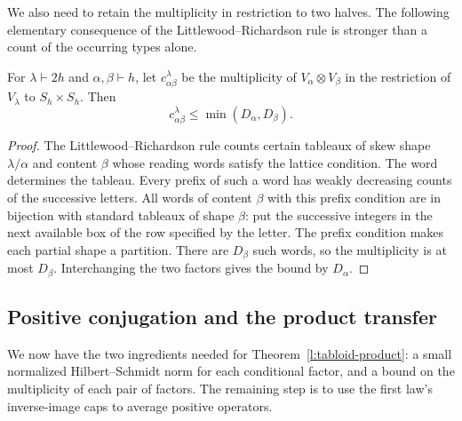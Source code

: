 We also need to retain the multiplicity in restriction to two halves.
The following elementary consequence of the Littlewood--Richardson
rule is stronger than a count of the occurring types alone.

\begin{lemma}
\label{l:tabloid-lr}
For $\lambda\vdash 2h$ and $\alpha,\beta\vdash h$, let
$c_{\alpha\beta}^\lambda$ be the multiplicity of
$V_\alpha\otimes V_\beta$ in the restriction of $V_\lambda$
to $S_h\times S_h$.  Then
\[
 c_{\alpha\beta}^\lambda\le\min(D_\alpha,D_\beta).
\]
\end{lemma}

\begin{proof}
The Littlewood--Richardson rule counts certain tableaux of skew
shape $\lambda/\alpha$ and content $\beta$ whose reading words
satisfy the lattice condition.  The word determines the tableau.
Every prefix of such a word has weakly decreasing counts of the
successive letters.  All words of content $\beta$ with this prefix
condition are in bijection with standard tableaux of shape $\beta$:
put the successive integers in the next available box of the row
specified by the letter.  The prefix condition makes each partial
shape a partition.  There are $D_\beta$ such words, so the
multiplicity is at most $D_\beta$.  Interchanging the two factors
gives the bound by $D_\alpha$.
\end{proof}

\subsection{Positive conjugation and the product transfer}

We now have the two ingredients needed for
Theorem~\ref{l:tabloid-product}: a small normalized Hilbert--Schmidt
norm for each conditional factor, and a bound on the multiplicity
of each pair of factors.  The remaining step is to use the first
law's inverse-image caps to average positive operators.

